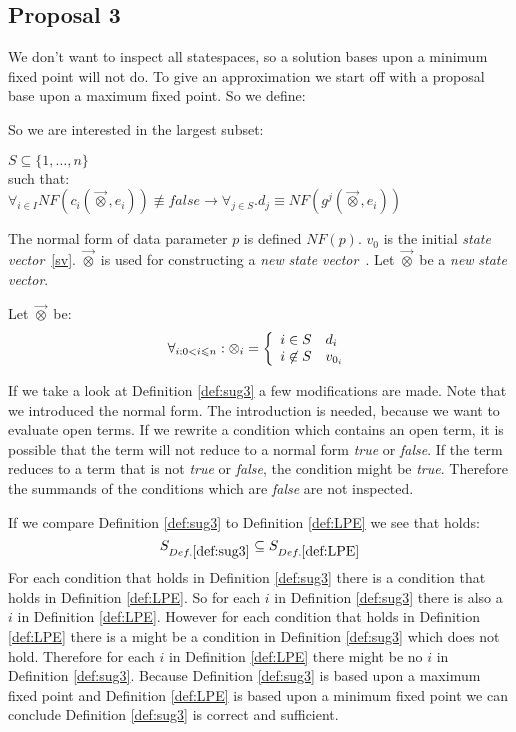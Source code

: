 \documentclass[a4paper,10pt]{article}
\newcommand{\ovr}{\overrightarrow}
\newcommand{\ti}{\textit}
\newcommand{\sv}{\textit{state vector}}
\begin{document}
\subsection{Proposal 3}
We don't want to inspect all statespaces, so a solution bases upon a minimum fixed point will not do. To give
an approximation we start off with a proposal base upon a maximum fixed point. So we define: 
\begin{defn} \label{def:sug3} So we are interested in the largest subset:

\begin{flushleft}
$ S \subseteq \lbrace 1, \ldots, n \rbrace $ \\

such that:\\

$\forall_{i \in I} NF( c_i ( \ovr{\otimes}, e_i ) ) \not\equiv false \rightarrow \forall_{j \in S}.d_j \equiv  NF( g^j(\ovr{\otimes}, e_i )) $
\end{flushleft}
 
The normal form of data parameter $p$ is defined $NF(p)$. $v_0$ is the initial \sv\ \ref{sv}. 
$\ovr{\otimes}$ is used for constructing a \ti{new} \sv\ . Let $\ovr{\otimes}$ be a \ti{new} \sv .

\begin{defn} \label{def:otimes} Let $\ovr{\otimes}$ be:
\begin{displaymath}
    \forall_{i:0<i\leqslant n}:\otimes_i = \left\{
        \begin{array}{l l}
            i \in S                      & d_i \\
            i \not\in S                  & v_{0_i} \\
        \end{array} \right.
\end{displaymath}
\end{defn}
If we take a look at Definition \ref{def:sug3} a few modifications are made. 
Note that we introduced the normal form. The introduction is needed, because we want to 
evaluate open terms. If we rewrite a condition which contains an open term, it is possible
that the term will not reduce to a normal form \ti{true} or \ti{false}. If the term reduces to a
term that is not \ti{true} or \ti{false}, the condition might be \ti{true}. Therefore the summands of the conditions
which are \ti{false} are not inspected.

If we compare Definition \ref{def:sug3} to Definition \ref{def:LPE} we see that holds: $$S_{Def. \ref{def:sug3}} \subseteq
S_{Def. \ref{def:LPE}} $$  For each condition that holds in Definition \ref{def:sug3} there is a condition that holds in Definition \ref{def:LPE}. So for each $i$ in Definition \ref{def:sug3} there is also a $i$ in Definition \ref{def:LPE}. However for each condition that holds in Definition \ref{def:LPE} there is a might be a condition in Definition \ref{def:sug3} which does not hold. Therefore for each $i$ in Definition \ref{def:LPE} there might be no $i$ in Definition \ref{def:sug3}. Because Definition \ref{def:sug3} is based upon a maximum fixed point and Definition \ref{def:LPE} is based upon a minimum fixed point we can conclude Definition \ref{def:sug3} is correct and sufficient.


\end{defn}
\end{document}
